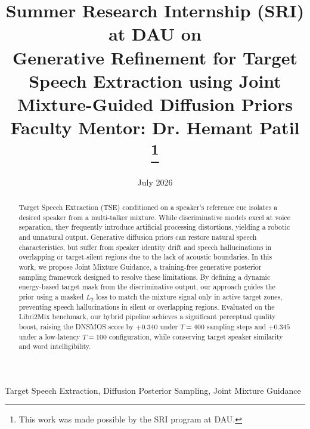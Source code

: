 \documentclass[conference]{IEEEtran}
\begin{document}
\title{Summer Research Internship (SRI) at DAU on\\
{Generative Refinement for Target Speech Extraction using Joint Mixture-Guided Diffusion Priors}\\[1ex]
\large \textbf{Faculty Mentor: Dr. Hemant Patil}%
\thanks{This work was made possible by the SRI program at DAU.}
}

\author{
}

\date{July 2026}

\maketitle

\begin{abstract}
Target Speech Extraction (TSE) conditioned on a speaker's reference cue isolates a desired speaker from a multi-talker mixture. While discriminative models excel at voice separation, they frequently introduce artificial processing distortions, yielding a robotic and unnatural output. Generative diffusion priors can restore natural speech characteristics, but suffer from speaker identity drift and speech hallucinations in overlapping or target-silent regions due to the lack of acoustic boundaries. In this work, we propose Joint Mixture Guidance, a training-free generative posterior sampling framework designed to resolve these limitations. By defining a dynamic energy-based target mask from the discriminative output, our approach guides the prior using a masked $L_2$ loss to match the mixture signal only in active target zones, preventing speech hallucinations in silent or overlapping regions. Evaluated on the Libri2Mix benchmark, our hybrid pipeline achieves a significant perceptual quality boost, raising the DNSMOS score by $+0.340$ under $T=400$ sampling steps and $+0.345$ under a low-latency $T=100$ configuration, while conserving target speaker similarity and word intelligibility.
\end{abstract}


\begin{IEEEkeywords}
Target Speech Extraction, Diffusion Posterior Sampling,  Joint Mixture Guidance
\end{IEEEkeywords}
\end{document}
